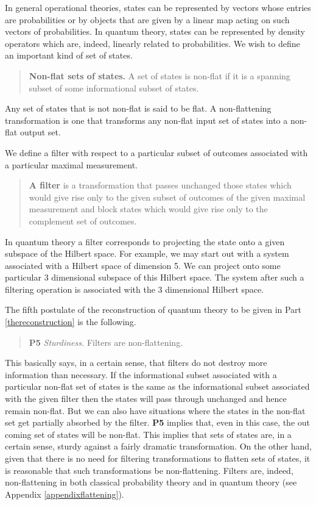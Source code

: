\documentclass[10pt]{article}
\begin{document}
In general operational theories, states can be represented by vectors whose entries are probabilities or by objects that are given by a linear map acting on such vectors of probabilities. In quantum theory, states can be represented by density operators which are, indeed, linearly related to probabilities.   We wish to define an important kind of set of states.
\begin{quote}
{\bf Non-flat sets of states.}  A set of states is non-flat if it is a spanning subset of some informational subset of states.
\end{quote}
Any set of states that is not non-flat is said to be flat.  A non-flattening transformation is one that transforms any non-flat input set of states into a non-flat output set.

We define a filter with respect to a particular subset of outcomes associated with a particular maximal measurement.
\begin{quote}
{\bf A filter} is a transformation that passes unchanged those states which would give rise only to the given subset of outcomes of the given maximal measurement and block states which would give rise only to the complement set of outcomes.
\end{quote}
In quantum theory a filter corresponds to projecting the state onto a given subspace of the Hilbert space.  For example, we may start out with a system associated with a Hilbert space of dimension 5.  We can project onto some particular 3 dimensional subspace of this Hilbert space.   The system after such a filtering operation is associated with the 3 dimensional Hilbert space.

The fifth postulate of the reconstruction of quantum theory to be given in Part \ref{thereconstruction} is the following.
\begin{quote}
{\bf P5} \emph{Sturdiness.} Filters are non-flattening.
\end{quote}
This basically says, in a certain sense, that filters do not destroy more information than necessary.  If the informational subset associated with a particular non-flat set of states is the same as the informational subset associated with the given filter then the states will pass through unchanged and hence remain non-flat. But we can also have situations where the states in the non-flat set get partially absorbed by the filter.  {\bf P5} implies that, even in this case, the out coming set of states will be non-flat.  This implies that sets of states are, in a certain sense, sturdy against a fairly dramatic transformation.  On the other hand, given that there is no need for filtering transformations to flatten sets of states, it is reasonable that such transformations be non-flattening.   Filters are, indeed, non-flattening in both classical probability theory and in quantum theory (see Appendix \ref{appendixflattening}).
\end{document}
